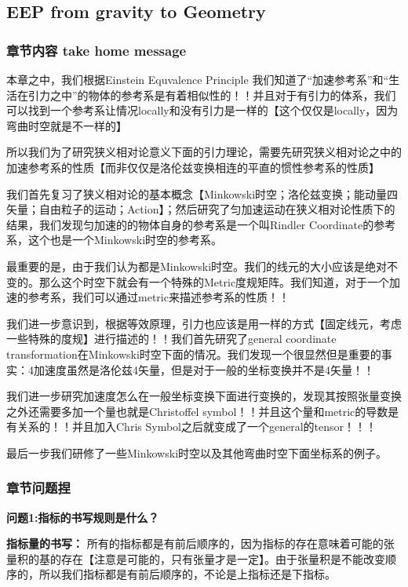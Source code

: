 
\subsection{EEP from gravity to Geometry}

\subsubsection{章节内容 take home message}
本章之中，我们根据Einstein Equvalence Principle 我们知道了“加速参考系”和“生活在引力之中”的物体的参考系是有着相似性的！！并且对于有引力的体系，我们可以找到一个参考系让情况locally和没有引力是一样的【这个仅仅是locally，因为弯曲时空就是不一样的】

所以我们为了研究狭义相对论意义下面的引力理论，需要先研究狭义相对论之中的加速参考系的性质【而非仅仅是洛伦兹变换相连的平直的惯性参考系的性质】

\bigskip
我们首先复习了狭义相对论的基本概念【Minkowski时空；洛伦兹变换；能动量四矢量；自由粒子的运动；Action】；然后研究了匀加速运动在狭义相对论性质下的结果，我们发现匀加速的的物体自身的参考系是一个叫Rindler Coordinate的参考系，这个也是一个Minkowski时空的参考系。

\bigskip
最重要的是，由于我们认为都是Minkowski时空。我们的线元的大小应该是绝对不变的。那么这个时空下就会有一个特殊的Metric度规矩阵。我们知道，对于一个加速的参考系，我们可以通过metric来描述参考系的性质！！

\bigskip
我们进一步意识到，根据等效原理，引力也应该是用一样的方式【固定线元，考虑一些特殊的度规】进行描述的！！我们首先研究了general coordinate transformation在Minkowski时空下面的情况。我们发现一个很显然但是重要的事实：4加速度虽然是洛伦兹4矢量，但是对于一般的坐标变换并不是4矢量！！

\bigskip
我们进一步研究加速度怎么在一般坐标变换下面进行变换的，发现其按照张量变换之外还需要多加一个量也就是Christoffel symbol！！并且这个量和metric的导数是有关系的！！并且加入Chris Symbol之后就变成了一个general的tensor！！！

\bigskip
最后一步我们研修了一些Minkowski时空以及其他弯曲时空下面坐标系的例子。


\subsubsection{章节问题捏}

\textbf{问题1:指标的书写规则是什么？}

\textbf{指标量的书写：}
所有的指标都是有前后顺序的，因为指标的存在意味着可能的张量积的基的存在【注意是可能的，只有张量才是一定】。由于张量积是不能改变顺序的，所以我们指标都是有前后顺序的，不论是上指标还是下指标。

